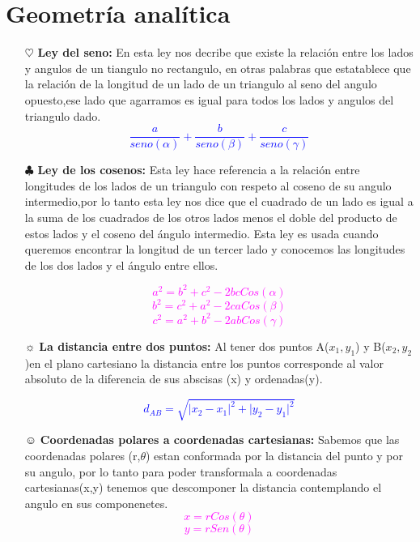 \documentclass[letterpaper,12pt]{article}
\begin{document}
\section{Geometría analítica}
\begin{itemize}
\item[$\heartsuit$]{\textbf{Ley del seno:}} En esta ley nos decribe que existe la relación entre los lados y angulos de un tiangulo no rectangulo, en otras palabras que estatablece que la relación de la longitud de un lado de un triangulo al seno del angulo opuesto,ese lado que agarramos es igual para todos los lados y angulos del triangulo dado.
\textcolor{blue}{$$\frac{a}{seno(\alpha)}+\frac{b}{seno(\beta)}+\frac{c}{seno(\gamma)}$$}
\item[$\clubsuit$]{\textbf{Ley de los cosenos:}} Esta ley hace referencia a la relación entre longitudes de los lados de un triangulo con respeto al coseno de su angulo intermedio,por lo tanto esta ley nos dice que el cuadrado de un lado es igual a la suma de los cuadrados de los otros lados menos el doble del producto de estos lados y el coseno del ángulo intermedio. Esta ley es usada cuando queremos encontrar la longitud de un tercer lado y conocemos las longitudes de los dos lados y el ángulo entre ellos.

\textcolor{magenta}{$$a^{2}=b^{2}+c^{2}-2bc Cos(\alpha)$$}
\textcolor{magenta}{$$b^{2}=c^{2}+a^{2}-2ca Cos(\beta)$$}
\textcolor{magenta}{$$c^{2}=a^{2}+b^{2}-2ab Cos(\gamma)$$}

\item[$\sun$] {\textbf{La distancia entre dos puntos:}} Al tener dos puntos A($x_1,y_1$) y B($x_2,y_2$)en el plano cartesiano la distancia entre los puntos corresponde al valor absoluto de la diferencia de sus abscisas (x) y ordenadas(y).

\textcolor{blue}{$$d_{AB}=\sqrt{ {\lvert x_2-x_1 \rvert}^{2}+{\lvert y_2-y_1 \rvert}^{2}}$$}
\item[$\smiley$] {\textbf{Coordenadas polares a coordenadas cartesianas:}} Sabemos que las coordenadas polares (r,$\theta$) estan conformada por la distancia del punto y por su angulo, por lo tanto para poder transformala a coordenadas cartesianas(x,y) tenemos que descomponer la distancia contemplando el angulo en sus componenetes.
\textcolor{magenta}{$$x=r Cos(\theta)$$}
\textcolor{magenta}{$$y=r Sen(\theta)$$}


\end{itemize}
\end{document}

